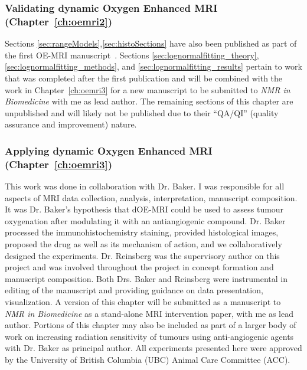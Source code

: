 \subsubsection{Validating dynamic Oxygen Enhanced MRI (Chapter~\ref{ch:oemri2})}
Sections \ref{sec:rangeModels},\ref{sec:histoSections} have also been published as part of the first OE-MRI manuscript~\cite{Moosvi:2018ca}.
Sections \ref{sec:lognormalfitting_theory}, \ref{sec:lognormalfitting_methods}, and \ref{sec:lognormalfitting_results} pertain to work that was completed after the first publication and will be combined with the work in Chapter~\ref{ch:oemri3} for a new manuscript to be submitted to \textit{NMR in Biomedicine} with me as lead author.
The remaining sections of this chapter are unpublished and will likely not be published due to their ``QA/QI'' (quality assurance and improvement) nature.

\subsubsection{Applying dynamic Oxygen Enhanced MRI (Chapter~\ref{ch:oemri3})}
This work was done in collaboration with Dr. Baker.
I was responsible for all aspects of MRI data collection, analysis, interpretation, manuscript composition. 
It was Dr. Baker's hypothesis that dOE-MRI could be used to assess tumour oxygenation after modulating it with an antiangiogenic compound. 
Dr. Baker processed the immunohistochemistry staining, provided histological images, proposed the drug as well as its mechanism of action, and we collaboratively designed the experiments. 
Dr. Reinsberg was the supervisory author on this project and was involved throughout the project in concept formation and manuscript composition. 
Both Drs. Baker and Reinsberg were instrumental in editing of the manuscript and providing guidance on data presentation, visualization.
A version of this chapter will be submitted as a manuscript to \textit{NMR in Biomedicine} as a stand-alone MRI intervention paper, with me as lead author.
Portions of this chapter may also be included as part of a larger body of work on increasing radiation sensitivity of tumours using anti-angiogenic agents with Dr. Baker as principal author.
All experiments presented here were approved by the University of British Columbia (UBC) Animal Care Committee (ACC).